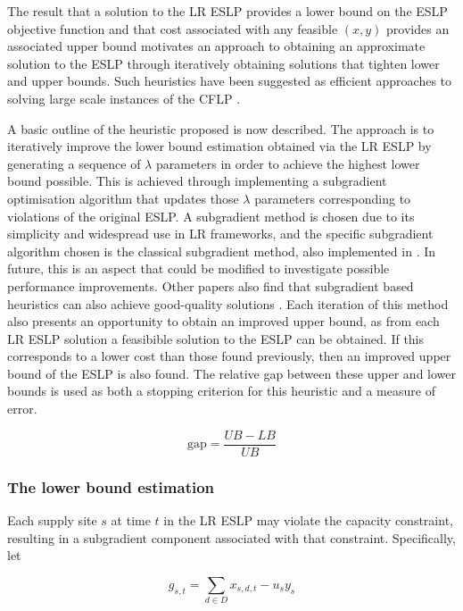 The result that a solution to the LR ESLP provides a lower bound on the ESLP
objective function and that cost associated with any feasible $(x, y)$ provides
an associated upper bound motivates an approach to obtaining an approximate solution to the 
ESLP through iteratively obtaining solutions that tighten lower and upper bounds. Such heuristics
have been suggested as efficient approaches to solving large scale instances 
of the CFLP \cite{cornuejols1991comparison}.

A basic outline of the heuristic proposed is now described. The approach is to iteratively improve
the lower bound estimation obtained via the LR ESLP by generating a sequence of 
$\lambda$ parameters in order to achieve the highest lower bound possible. This
is achieved through implementing a subgradient optimisation algorithm that updates those $\lambda$
parameters corresponding to violations of the original ESLP. A subgradient method is chosen due to
its simplicity and widespread use in LR frameworks, and the specific subgradient algorithm chosen
is the classical subgradient method, also implemented in \cite{wu2006capacitated}. In future, this
is an aspect that could be modified to investigate possible performance improvements. Other 
papers also find that subgradient based
heuristics can also achieve good-quality solutions \cite{cornuejols1991comparison}.
Each iteration of this method also presents an opportunity to obtain an improved upper bound, as from each LR ESLP solution
a feasibible solution to the ESLP can be obtained. If this corresponds to
a lower cost than those found previously, then an improved upper bound of the ESLP is also found.
The relative gap between these upper and lower bounds is used as both a stopping criterion for this 
heuristic and a measure of error.

\begin{equation}\label{eq:gap}
    \text{gap} = \frac{UB - LB}{UB}
\end{equation}


\subsubsection{The lower bound estimation}

Each supply site $s$ at time $t$ in the LR ESLP may violate the capacity constraint, resulting in a 
subgradient component associated with that constraint. Specifically, let

\begin{equation} g_{s,t} = \sum_{d \in D} x_{s,d,t} - u_s y_s \end{equation}

